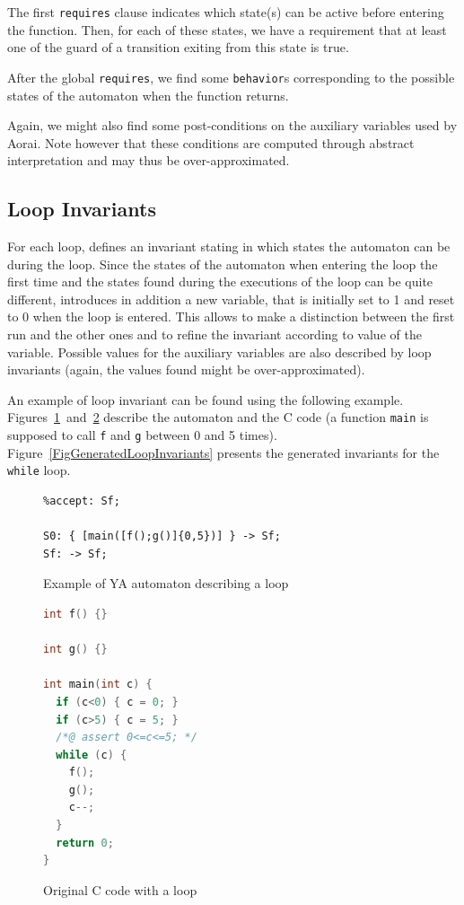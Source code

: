 \documentclass{report}
\begin{document}
\lstset{language=C,alsolanguage=ACSL}
The first \lstinline|requires| clause indicates which state(s) can be active
before entering the function. Then, for each of these states, we have a
requirement that at least one of the guard of a transition exiting from this
state is true.

After the global \lstinline|requires|, we find some \lstinline|behavior|s
corresponding to the possible states of the automaton when the function
returns.

Again, we might also find some post-conditions on the auxiliary variables used
by Aorai. Note however that these conditions are computed through abstract
interpretation and may thus be over-approximated.

\subsection{Loop Invariants}
\label{SectGeneratedLoopInvariants}

For each loop, \aorai defines an invariant stating in which states the
automaton can be during the loop. Since the states of the automaton when
entering the loop the first time and the states found during the executions
of the loop can be quite different, \aorai introduces in addition a 
new variable, that is initially set to 1 and reset to 0 when the loop is
entered. This allows to make a distinction between the first run and the other
ones and to refine the invariant according to value of the variable.
Possible values for the auxiliary variables are also described by loop
invariants (again, the values found might be over-approximated).

An example of loop invariant can be found using the following example.
Figures~\ref{fig:ya-loop}~and~\ref{fig:c-loop} describe the automaton and the
C code (a function \lstinline|main| is supposed to call \lstinline|f| and
\lstinline|g| between 0 and 5 times). Figure~\ref{FigGeneratedLoopInvariants}
presents the generated invariants for the \lstinline|while| loop.
\begin{figure}
\begin{lstlisting}[language=ya]
%init: S0;
%accept: Sf;

S0: { [main([f();g()]{0,5})] } -> Sf;
Sf: -> Sf;
\end{lstlisting}
\caption{Example of YA automaton describing a loop}
\label{fig:ya-loop}
\end{figure}

\begin{figure}[ht]
\begin{lstlisting}[language=C,alsolanguage=ACSL]
int f() {}

int g() {}

int main(int c) {
  if (c<0) { c = 0; }
  if (c>5) { c = 5; }
  /*@ assert 0<=c<=5; */
  while (c) {
    f();
    g();
    c--;
  }
  return 0;
}
\end{lstlisting}
\caption{Original C code with a loop}
\label{fig:c-loop}
\end{figure}
\end{document}
